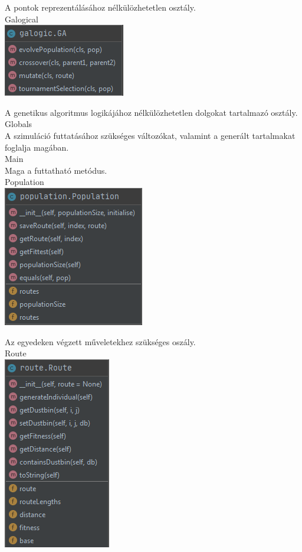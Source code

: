 A pontok reprezentálásához nélkülözhetetlen osztály.
\\
Galogical\\

\includegraphics[scale=0.8]{images/galogic.png}

A genetikus algoritmus logikájához nélkülözhetetlen dolgokat tartalmazó osztály.
\\
Globals\\

A szimuláció futtatásához szükséges változókat, valamint a generált tartalmakat foglalja magában.
\\
Main\\

Maga a futtatható metódus.
\\
Population\\

\includegraphics[scale=0.8]{images/population.png}

Az egyedeken végzett műveletekhez szükséges oszály.
\\
Route\\

\includegraphics[scale=0.8]{images/route.png}

